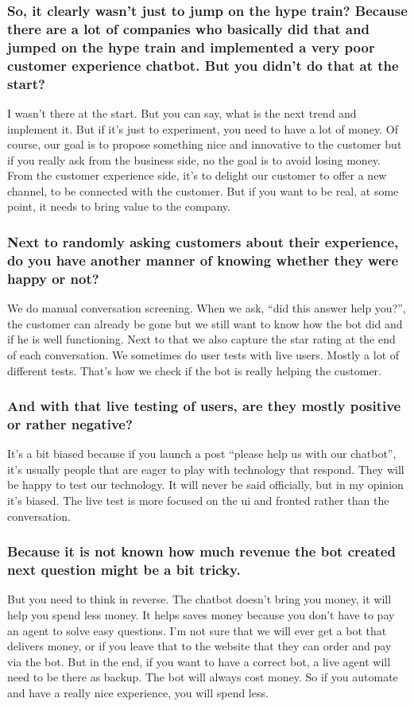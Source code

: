 \begin{appendices}
	\subsubsection{So, it clearly wasn’t just to jump on the hype train? Because there are a lot of companies who basically did that and jumped on the hype train and implemented a very poor customer experience chatbot. But you didn’t do that at the start?}
	I wasn’t there at the start. But you can say, what is the next trend and implement it. But if it’s just to experiment, you need to have a lot of money. Of course, our goal is to propose something nice and innovative to the customer but if you really ask from the business side, no the goal is to avoid losing money. From the customer experience side, it’s to delight our customer to offer a new channel, to be connected with the customer. But if you want to be real, at some point, it needs to bring value to the company.
	
	\subsubsection{Next to randomly asking customers about their experience, do you have another manner of knowing whether they were happy or not?}
	We do manual conversation screening. When we ask, “did this answer help you?”, the customer can already be gone but we still want to know how the bot did and if he is well functioning. Next to that we also capture the star rating at the end of each conversation. We sometimes do user tests with live users. Mostly a lot of different tests. That’s how we check if the bot is really helping the customer.
	
	\subsubsection{And with that live testing of users, are they mostly positive or rather negative?}
	It’s a bit biased because if you launch a post “please help us with our chatbot”, it’s usually people that are eager to play with technology that respond. They will be happy to test our technology. It will never be said officially, but in my opinion it’s biased. The live test is more focused on the \acrfull{ui} and fronted rather than the conversation.
	
	\subsubsection{Because it is not known how much revenue the bot created next question might be a bit tricky.}
	But you need to think in reverse. The chatbot doesn’t bring you money, it will help you spend less money. It helps saves money because you don’t have to pay an agent to solve easy questions. I’m not sure that we will ever get a bot that delivers money, or if you leave that to the website that they can order and pay via the bot. But in the end, if you want to have a correct bot, a live agent will need to be there as backup. The bot will always cost money. So if you automate and have a really nice experience, you will spend less.
	

\end{appendices}
